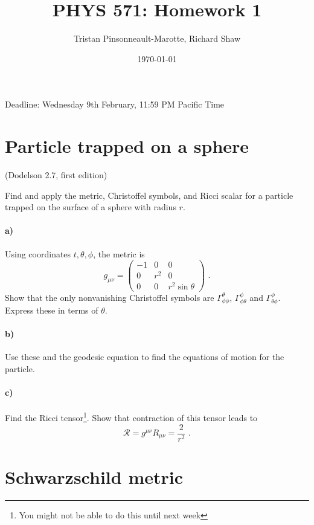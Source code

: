 \documentclass[12pt]{article}
\author{Tristan Pinsonneault-Marotte, Richard Shaw}
\title{PHYS 571: Homework 1}
\date{\today}
\begin{document}
\maketitle

Deadline: Wednesday 9th February, 11:59 PM Pacific Time

\section{Particle trapped on a sphere}
(Dodelson 2.7, first edition)

Find and apply the metric, Christoffel symbols, and Ricci scalar for a particle
trapped on the surface of a sphere with radius $r$.

\paragraph{a)} Using coordinates $t, \theta, \phi$, the metric is
\begin{equation}
    g_{\mu\nu} = \begin{pmatrix}
        -1 & 0 & 0 \\
        0 & r^2 & 0 \\
        0 & 0 & r^2 \sin\theta
    \end{pmatrix}
    \text{ .}
\end{equation}
Show that the only nonvanishing Christoffel symbols are
$\Gamma^\theta_{\phi\phi}$, $\Gamma^\phi_{\phi\theta}$ and
$\Gamma^\phi_{\theta\phi}$. Express these in terms of $\theta$.

\paragraph{b)} Use these and the geodesic equation to find the equations of
motion for the particle.

\paragraph{c)} Find the Ricci tensor\footnote{You might not be able to do this until next week}. Show that contraction of this tensor leads
to
\begin{equation}
    \mathcal{R} = g^{\mu\nu} R_{\mu\nu} = \frac{2}{r^2} \text{ .}
\end{equation}

\section{Schwarzschild metric}
\end{document}
